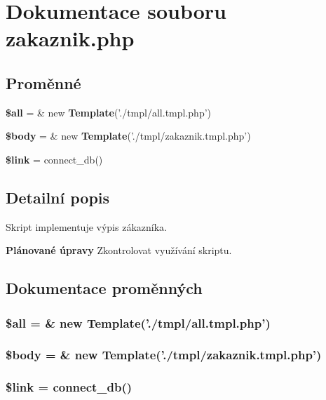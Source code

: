 \section{Dokumentace souboru zakaznik.php}
\label{zakaznik_8php}
\subsection*{Proměnné}
\begin{CompactItemize}
\item 
{\bf \$all} = \& new {\bf Template}('./tmpl/all.tmpl.php')
\item 
{\bf \$body} = \& new {\bf Template}('./tmpl/zakaznik.tmpl.php')
\item 
{\bf \$link} = connect\_\-db()
\end{CompactItemize}


\subsection{Detailní popis}
Skript implementuje výpis zákazníka.

\begin{Desc}
\item[{\bf Plánované úpravy}]Zkontrolovat využívání skriptu. \end{Desc}


\subsection{Dokumentace proměnných}
\subsubsection{\setlength{\rightskip}{0pt plus 5cm}\$all = \& new {\bf Template}('./tmpl/all.tmpl.php')}\label{zakaznik_8php_3c74ea9d2348c9aba28d36e692bef2d2}


\subsubsection{\setlength{\rightskip}{0pt plus 5cm}\$body = \& new {\bf Template}('./tmpl/zakaznik.tmpl.php')}\label{zakaznik_8php_26b9f9373f7bb79dfcf8a86dff086b45}


\subsubsection{\setlength{\rightskip}{0pt plus 5cm}\$link = connect\_\-db()}\label{zakaznik_8php_5d346e31b75d916e3bac9cb193bfc97f}


